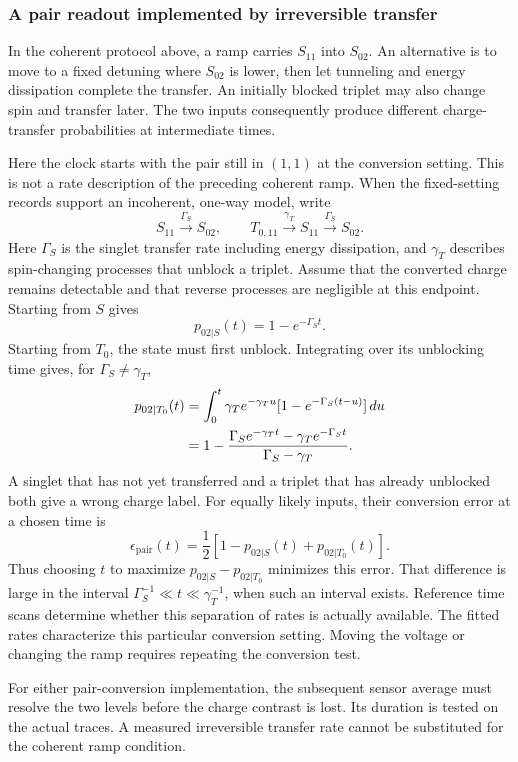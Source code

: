 \subsubsection{A pair readout implemented by irreversible transfer}
In the coherent protocol above, a ramp carries $S_{11}$ into $S_{02}$.
An alternative is to move to a fixed detuning where $S_{02}$ is lower,
then let tunneling and energy dissipation complete the transfer.
An initially blocked triplet may also change spin and transfer later.
The two inputs consequently produce different charge-transfer
probabilities at intermediate times.

Here the clock starts with the pair still in $(1,1)$ at the conversion
setting. This is not a rate description of the preceding coherent ramp.
When the fixed-setting records support an incoherent, one-way model,
write
\[
 S_{11}\xrightarrow{\Gamma_S} S_{02},\qquad
 T_{0,11}\xrightarrow{\gamma_T}S_{11}
                        \xrightarrow{\Gamma_S}S_{02}.
\]
Here $\Gamma_S$ is the singlet transfer rate including energy
dissipation, and $\gamma_T$ describes spin-changing processes that
unblock a triplet. Assume that the converted charge remains
detectable and that reverse processes are negligible at this
endpoint. Starting from $S$ gives
\[
 p_{02|S}(t)=1-e^{-\Gamma_S t}.
\]
Starting from $T_0$, the state must first unblock. Integrating over
its unblocking time gives, for $\Gamma_S\ne\gamma_T$,
\begin{align}
 p_{02|T_0}(t)
 &=\int_0^t\gamma_Te^{-\gamma_T u}
                         [1-e^{-\Gamma_S(t-u)}]\,du \notag\\
 &=1-\frac{\Gamma_S e^{-\gamma_Tt}
                 -\gamma_Te^{-\Gamma_St}}{\Gamma_S-\gamma_T}.
 \label{eq:calibration-blockade-conversion}
\end{align}
A singlet that has not yet transferred and a triplet that has already
unblocked both give a wrong charge label. For equally likely inputs,
their conversion error at a chosen time is
\[
 \epsilon_{\mathrm{pair}}(t)
 =\frac12[1-p_{02|S}(t)+p_{02|T_0}(t)].
\]
Thus choosing $t$ to maximize $p_{02|S}-p_{02|T_0}$ minimizes this
error. That difference is large in the interval
$\Gamma_S^{-1}\ll t\ll\gamma_T^{-1}$,
when such an interval exists. Reference time scans determine
whether this separation of rates is actually available.
The fitted rates characterize this particular conversion setting.
Moving the voltage or changing the ramp requires repeating the
conversion test.

For either pair-conversion implementation, the subsequent sensor
average must resolve the two levels before the charge contrast is
lost. Its duration is tested on the actual traces. A measured
irreversible transfer rate cannot be substituted for the coherent
ramp condition.

